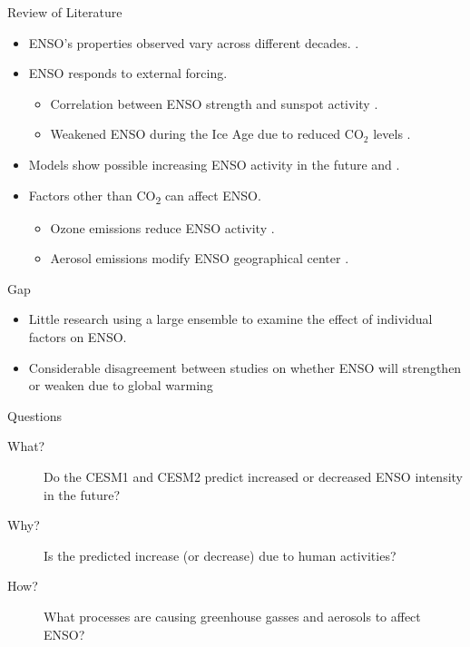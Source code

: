 \documentclass{beamer}
\begin{document}
\begin{frame}{Review of Literature}
  \begin{itemize}
  \item ENSO's properties observed vary across different decades. \citep{lubbecke2014assessing}.
  \item ENSO responds to external forcing.
    \begin{itemize}
    \item Correlation between ENSO strength and sunspot activity \citep{emile2007nino}.
    \item Weakened ENSO during the Ice Age due to reduced CO$_2$ levels \citep{zhu2017reduced}.
    \end{itemize}
  \item Models show possible increasing ENSO activity in the future \citep{zheng2017response} and \citep{maher2018enso}.
  \item Factors other than CO\textsubscript{2} can affect ENSO.
    \begin{itemize}
    \item Ozone emissions reduce ENSO activity \citep{nowack2017role}.
    \item Aerosol emissions modify ENSO geographical center \citep{stevenson2017forced}.
    \end{itemize}
  \end{itemize}
\end{frame}

\begin{frame}{Gap}
  \begin{itemize}
  \item Little research using a large ensemble to examine the effect of individual factors on ENSO.
  \item Considerable disagreement between studies on whether ENSO will strengthen or weaken due to global warming
  \end{itemize}
\end{frame}

\begin{frame}{Questions}
  \begin{description}
  \item[What?] Do the CESM1 and CESM2 predict increased or decreased ENSO intensity in the future?
  \item[Why?] Is the predicted increase (or decrease) due to human activities?
  \item[How?] What processes are causing greenhouse gasses and aerosols to affect ENSO?
  \end{description}
\end{frame}
\end{document}

